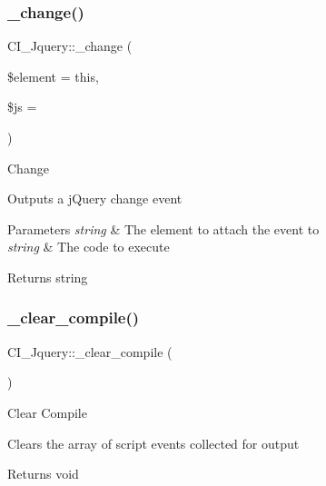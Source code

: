 \subsubsection{\texorpdfstring{\+\_\+change()}{\_change()}}
{\footnotesize\ttfamily C\+I\+\_\+\+Jquery\+::\+\_\+change (\begin{DoxyParamCaption}\item[{}]{\$element = {\ttfamily \textquotesingle{}this\textquotesingle{}},  }\item[{}]{\$js = {\ttfamily \textquotesingle{}\textquotesingle{}} }\end{DoxyParamCaption})\hspace{0.3cm}{\ttfamily [protected]}}

Change

Outputs a j\+Query change event


\begin{DoxyParams}{Parameters}
{\em string} & The element to attach the event to \\
\hline
{\em string} & The code to execute \\
\hline
\end{DoxyParams}
\begin{DoxyReturn}{Returns}
string 
\end{DoxyReturn}
\mbox{\label{class_c_i___jquery_a0668116916e1af87372f6d97b89e9b26}} 
\subsubsection{\texorpdfstring{\+\_\+clear\+\_\+compile()}{\_clear\_compile()}}
{\footnotesize\ttfamily C\+I\+\_\+\+Jquery\+::\+\_\+clear\+\_\+compile (\begin{DoxyParamCaption}{ }\end{DoxyParamCaption})\hspace{0.3cm}{\ttfamily [protected]}}

Clear Compile

Clears the array of script events collected for output

\begin{DoxyReturn}{Returns}
void 
\end{DoxyReturn}
\mbox{\label{class_c_i___jquery_ae67ce1e331db8892591085aee04cc8e9}} 
